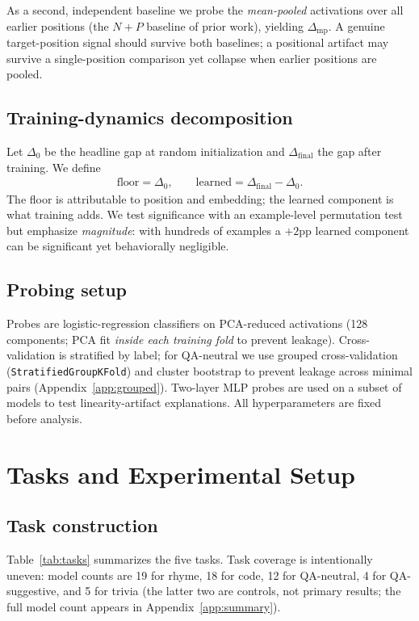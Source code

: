 \documentclass[11pt]{article}
\begin{document}
As a second, independent baseline we probe the \emph{mean-pooled} activations
over all earlier positions (the $N{+}P$ baseline of prior work), yielding
$\Delta_{\text{mp}}$. A genuine target-position signal should survive both
baselines; a positional artifact may survive a single-position comparison yet
collapse when earlier positions are pooled.

\subsection{Training-dynamics decomposition}
\label{sec:decomp}

Let $\Delta_0$ be the headline gap at random initialization and
$\Delta_{\text{final}}$ the gap after training. We define
\begin{align}
\text{floor} = \Delta_0, \qquad \text{learned} = \Delta_{\text{final}} - \Delta_0.
\end{align}
The floor is attributable to position and embedding; the learned component is
what training adds. We test significance with an example-level permutation test
but emphasize \emph{magnitude}: with hundreds of examples a $+2$pp learned
component can be significant yet behaviorally negligible.

\subsection{Probing setup}
\label{sec:probing}

Probes are logistic-regression classifiers on PCA-reduced activations
(128 components; PCA fit \emph{inside each training fold} to prevent leakage).
Cross-validation is stratified by label; for QA-neutral we use grouped
cross-validation (\texttt{StratifiedGroupKFold}) and cluster bootstrap to prevent
leakage across minimal pairs (Appendix~\ref{app:grouped}). Two-layer MLP probes
are used on a subset of models to test linearity-artifact explanations. All
hyperparameters are fixed before analysis.

\section{Tasks and Experimental Setup}
\label{sec:setup}

\subsection{Task construction}
\label{sec:tasks}

Table~\ref{tab:tasks} summarizes the five tasks. Task coverage is intentionally
uneven: model counts are 19 for rhyme, 18 for code, 12 for QA-neutral, 4 for
QA-suggestive, and 5 for trivia (the latter two are controls, not primary
results; the full model count appears in Appendix~\ref{app:summary}).
\end{document}
